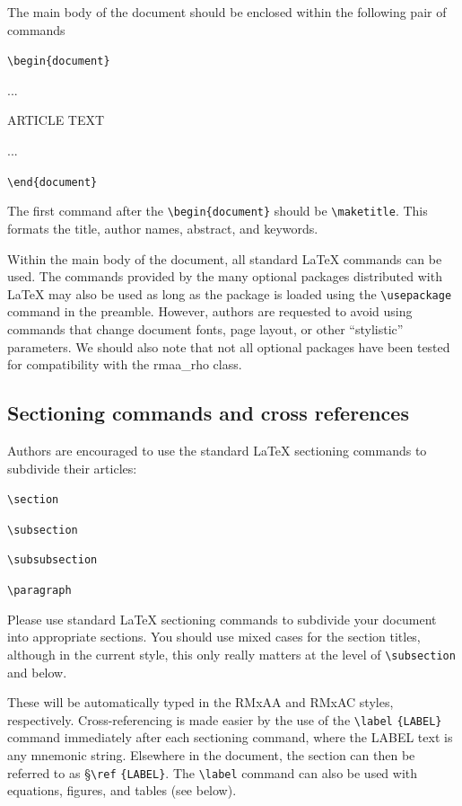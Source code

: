 \documentclass[10pt,letter,twoside]{rmat-rho}
\newcommand{\CS}[1]{\texttt{\textbackslash #1}}
\begin{document}
The main body of the document should be enclosed within the following pair of commands

\bigskip
\CS{begin}\verb+{document}+

...

ARTICLE TEXT

...

\CS{end}\verb+{document}+
\bigskip

The first command after the \CS{begin}\verb+{document}+ should be \CS{maketitle}. This formats the title, author names, abstract, and keywords.

Within the main body of the document, all standard \LaTeX{} commands can be used. The commands provided by the many optional packages distributed with \LaTeX{} may also be used as long as the package is loaded using the \CS{usepackage} command in the preamble. However, authors are requested to avoid using commands that change document fonts, page layout, or other ``stylistic'' parameters. We should also note that not all optional packages have been tested for compatibility with the rmaa\_rho class.

\subsection{Sectioning commands and cross references}

Authors are encouraged to use the standard \LaTeX{} sectioning commands to subdivide their articles:

\bigskip

\CS{section}

\CS{subsection}

\CS{subsubsection}

\CS{paragraph}

\bigskip

Please use standard \LaTeX{} sectioning commands to subdivide your document into appropriate sections. You should use mixed cases for the section titles, although in the current style, this only really matters at the level of \CS{subsection} and below.

These will be automatically typed in the RMxAA and RMxAC styles, respectively. Cross-referencing is made easier by the use of the \CS{label} 
 \verb+{LABEL}+ command immediately after each sectioning command, where the LABEL text is any mnemonic string. Elsewhere in the document, the section can then be referred to as \S \CS{ref} \verb+{LABEL}+. The \CS{label} command can also be used with equations, figures, and tables (see below). 
\end{document}
